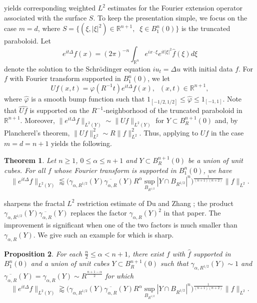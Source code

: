 \documentclass[11pt]{amsart}
\newtheorem{theorem}{Theorem}[section]
\newtheorem{prop}[theorem]{Proposition}
\theoremstyle{definition}
\theoremstyle{remark}
\numberwithin{equation}{section}
\renewcommand{\hat}{\widehat}
\newcommand{\R}{\mathbb{R}}
\newcommand{\less}{\lessapprox}
\begin{document}
  yields corresponding weighted $L^2$ estimates for the Fourier extension operator associated with the surface $S$. 
 To keep the presentation simple, we focus on the case $m=d$, where $S = \{ (\xi,|\xi|^2) \in \R^{n+1}, \;\; \xi \in B_1^n(0) \}$ is the truncated paraboloid. Let 
\[ e^{it\Delta} f(x) = (2\pi)^{-n} \int_{\R^n} e^{ix\cdot \xi} e^{i t |\xi|^2} \hat{f}(\xi) d\xi \]
denote the solution to the Schr\"odinger equation $iu_t = \Delta u$ with initial data $f$. For $f$ with Fourier transform supported in $B_1^n(0)$, we let 
\begin{equation}\label{eqn:U}
	 Uf(x,t) = \varphi(R^{-1}t) e^{it\Delta} f(x), \;\; (x,t)\in \R^{n+1},
\end{equation}
where $\hat{\varphi}$ is a smooth bump function such that $1_{[-1/2,1/2]} \leq \hat{\varphi}\leq 1_{[-1,1]}$. Note that $\widehat{Uf}$ is supported on the $R^{-1}$-neighborhood of the truncated paraboloid in $\R^{n+1}$. Moreover, $\| e^{it\Delta} f\|_{L^2(Y)} \sim \| Uf \|_{L^2(Y)}$ for $Y\subset B_R^{n+1}(0)$ and, by Plancherel's theorem, $\| Uf \|_{L^2}^2 \sim R \| f\|_{L^2}^2$. Thus, applying   to $Uf$ in the case $m=d=n+1$ yields the following. 
\begin{theorem}\label{cor:fractalRestriction}
	Let $n\geq 1$, $0\leq \alpha \leq n+1$ and $Y\subset B^{n+1}_{R}(0)$ be a union of unit cubes. For all $f$ whose Fourier transform is supported in $B_1^n(0)$, we have
\[
		\| e^{it\Delta} f\|_{L^2(Y)}\less \Big( \gamma_{\alpha,R^{1/2}}(Y) \overline{\gamma_{\alpha,R}}(Y) R^{\alpha}  
		\sup_{B_{R^{1/2}}} |Y\cap B_{R^{1/2}}|^{n}	 \Big)^{\frac{1}{(n+1)(n+2)}} \| f \|_{L^2}. 
\]
\end{theorem}


  sharpens the fractal $L^2$ restriction estimate of Du and Zhang \cite[Theorem 1.6]{DZ}; the product $\gamma_{\alpha,R^{1/2}}(Y) \overline{\gamma_{\alpha,R}}(Y)$ replaces the factor $\gamma_{\alpha,R}(Y)^2$ in that paper. The improvement is significant when one of the two factors is much smaller than $\gamma_{\alpha,R}(Y)$.  We give such an example for which  is sharp. 
\begin{prop}\label{prop:sharpnessFractal}
	For each $\frac{n}{2}\leq \alpha < n+1$, there exist   $f$ with $\hat{f}$ supported in $B_1^n(0)$  and a union of unit cubes $Y\subset B^{n+1}_{R}(0)$ such that $\gamma_{\alpha,R^{1/2}}(Y) \sim 1$ and $\overline{\gamma_{\alpha,R}}(Y) = \gamma_{\alpha,R}(Y) \sim R^{\frac{n+1-\alpha}{2}}$ for which 
	\[ 	\| e^{it\Delta} f\|_{L^2(Y)} \gtrapprox \Big( \gamma_{\alpha,R^{1/2}}(Y) \overline{\gamma_{\alpha,R}}(Y) R^{\alpha}  
	\sup_{B_{R^{1/2}}} |Y\cap B_{R^{1/2}}|^{n}	 \Big)^{\frac{1}{(n+1)(n+2)}} \| f \|_{L^2}. \]
\end{prop}	
\end{document}
